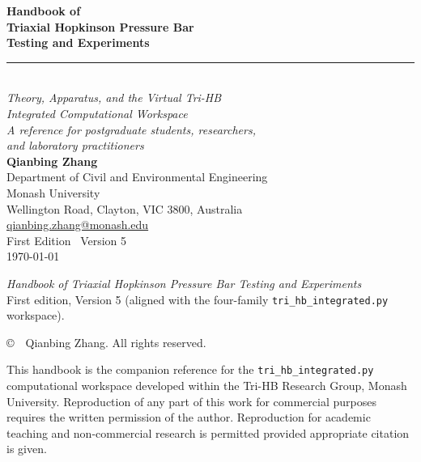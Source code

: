 \documentclass[11pt,a4paper,openany]{book}
\theoremstyle{handbook}
\begin{document}
\frontmatter

\thispagestyle{empty}
\begin{titlepage}
\centering
\vspace*{2cm}

{\Huge\bfseries\color{deepblue} Handbook of}\\[6pt]
{\Huge\bfseries\color{deepblue} Triaxial Hopkinson Pressure Bar}\\[6pt]
{\Huge\bfseries\color{deepblue} Testing and Experiments}\\[14pt]

{\color{rulegrey}\rule{0.7\textwidth}{0.6pt}}\\[14pt]

{\Large\itshape Theory, Apparatus, and the Virtual Tri-HB\\
Integrated Computational Workspace}\\[10pt]

{\Large\itshape A reference for postgraduate students, researchers,\\
and laboratory practitioners}\\[40pt]

{\Large\bfseries Qianbing Zhang}\\[6pt]
{\normalsize Department of Civil and Environmental Engineering}\\
{\normalsize Monash University}\\
{\normalsize Wellington Road, Clayton, VIC 3800, Australia}\\
{\normalsize\href{mailto:qianbing.zhang@monash.edu}{qianbing.zhang@monash.edu}}\\[60pt]

\vfill
{\large First Edition \textbullet\ Version 5}\\[6pt]
{\normalsize \today}
\end{titlepage}

\thispagestyle{empty}
\null\vfill
\noindent\textit{Handbook of Triaxial Hopkinson Pressure Bar Testing and Experiments}\\
First edition, Version 5 (aligned with the four-family
\texttt{tri\_hb\_integrated.py} workspace).

\bigskip
\noindent\copyright\ \the\year\ Qianbing Zhang. All rights reserved.

\bigskip
\noindent This handbook is the companion reference for the
\texttt{tri\_hb\_integrated.py} computational workspace developed within the
Tri-HB Research Group, Monash University. Reproduction of any part of this
work for commercial purposes requires the written permission of the author.
Reproduction for academic teaching and non-commercial research is permitted
provided appropriate citation is given.
\end{document}
